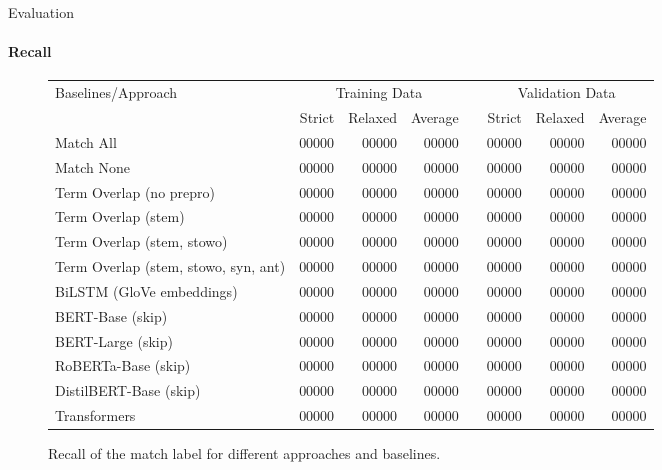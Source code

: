 \documentclass[english,handout]{mlutalk}
\begin{document}
\begin{frame}{Evaluation}
  \framesubtitle{Recall}
  \begin{figure}
    \centering
    \caption{Recall of the match label for different approaches and baselines.}
    \tiny
    \begin{tabular}{lrrrlrrr}
      \toprule
      Baselines/Approach & \multicolumn{3}{c}{Training Data} & & \multicolumn{3}{c}{Validation Data}\\ \cline{2-4} \cline{6-8}
        & Strict & Relaxed & Average & & Strict & Relaxed & Average\\
      \midrule
      Match All                           & 00000 & 00000 & 00000 & & 00000 & 00000 & 00000\\
      Match None                          & 00000 & 00000 & 00000 & & 00000 & 00000 & 00000\\
      Term Overlap (no prepro)            & 00000 & 00000 & 00000 & & 00000 & 00000 & 00000\\
      Term Overlap (stem)                 & 00000 & 00000 & 00000 & & 00000 & 00000 & 00000\\
      Term Overlap (stem, stowo)          & 00000 & 00000 & 00000 & & 00000 & 00000 & 00000\\
      Term Overlap (stem, stowo, syn, ant)& 00000 & 00000 & 00000 & & 00000 & 00000 & 00000\\
      \midrule
      BiLSTM (GloVe embeddings)           & 00000 & 00000 & 00000 & & 00000 & 00000 & 00000\\
      BERT-Base (skip)                    & 00000 & 00000 & 00000 & & 00000 & 00000 & 00000\\
      BERT-Large (skip)                   & 00000 & 00000 & 00000 & & 00000 & 00000 & 00000\\
      RoBERTa-Base (skip)                 & 00000 & 00000 & 00000 & & 00000 & 00000 & 00000\\
      DistilBERT-Base (skip)              & 00000 & 00000 & 00000 & & 00000 & 00000 & 00000\\
      Transformers                        & 00000 & 00000 & 00000 & & 00000 & 00000 & 00000\\
      \bottomrule
    \end{tabular}
  \end{figure}
\end{frame}
\end{document}
